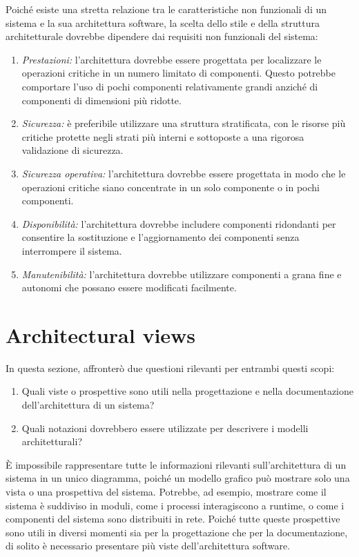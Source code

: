 Poiché esiste una stretta relazione tra le caratteristiche non funzionali di un sistema e la sua architettura software, la scelta dello stile e della struttura architetturale dovrebbe dipendere dai requisiti non funzionali del sistema:
\begin{enumerate}
    \item \textit{Prestazioni:} l'architettura dovrebbe essere progettata per localizzare le operazioni critiche in un numero limitato di componenti. Questo potrebbe comportare l’uso di pochi componenti relativamente grandi anziché di componenti di dimensioni più ridotte.
    \item \textit{Sicurezza:} è preferibile utilizzare una struttura stratificata, con le risorse più critiche protette negli strati più interni e sottoposte a una rigorosa validazione di sicurezza.
    \item \textit{Sicurezza operativa:} l'architettura dovrebbe essere progettata in modo che le operazioni critiche siano concentrate in un solo componente o in pochi componenti.
    \item \textit{Disponibilità:} l'architettura dovrebbe includere componenti ridondanti per consentire la sostituzione e l'aggiornamento dei componenti senza interrompere il sistema.
    \item \textit{Manutenibilità:} l'architettura dovrebbe utilizzare componenti a grana fine e autonomi che possano essere modificati facilmente.
\end{enumerate}

\section{Architectural views}
In questa sezione, affronterò due questioni rilevanti per entrambi questi scopi:
\begin{enumerate}
    \item Quali viste o prospettive sono utili nella progettazione e nella documentazione dell’architettura di un sistema?
    \item Quali notazioni dovrebbero essere utilizzate per descrivere i modelli architetturali?
\end{enumerate}
È impossibile rappresentare tutte le informazioni rilevanti sull’architettura di un sistema in un unico diagramma, poiché un modello grafico può mostrare solo una vista o una prospettiva del sistema. Potrebbe, ad esempio, mostrare come il sistema è suddiviso in moduli, come i processi interagiscono a runtime, o come i componenti del sistema sono distribuiti in rete. Poiché tutte queste prospettive sono utili in diversi momenti sia per la progettazione che per la documentazione, di solito è necessario presentare più viste dell'architettura software.

